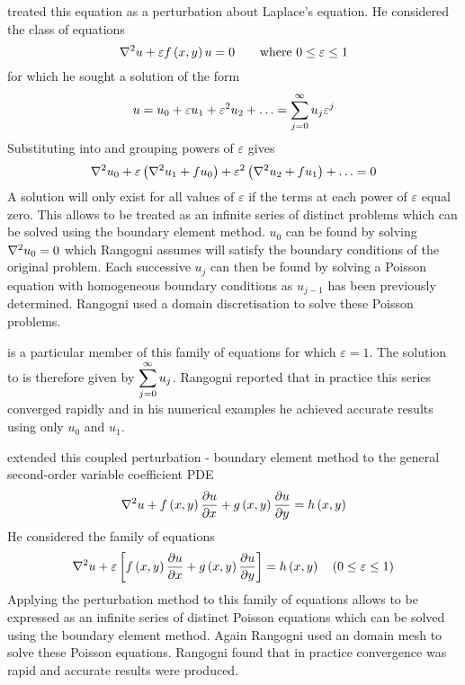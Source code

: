  treated 
this equation as a perturbation about Laplace's equation. He considered the class of equations
\begin{equation}
  \nabla^{2} {u} + \varepsilon  f\left( x,y \right)  u = 0 \qquad 
    \text{where } 0 \leq \varepsilon \leq 1
\label{eq:eqnfamily}
\end{equation}
for which he sought a solution of the form
\begin{equation}
  u = u_{0} + \varepsilon u_{1} + \varepsilon^{2} u_{2} + \ldots =
   \displaystyle\sum_{j=0}^{\infty}  u_{j} \varepsilon^{j}
\label{eq:uexpan}
\end{equation}
Substituting  into  and grouping powers
 of $\varepsilon$ gives
\begin{equation}
  \nabla^{2} {u_{0}} + \varepsilon \left( \nabla^{2} {u_{1}} + fu_{0} \right) +
  \varepsilon^{2} \left( \nabla^{2} {u_{2}} + fu_{1} \right) + \ldots = 0
\label{eq:groups}
\end{equation}
A solution will only exist for all values of $\varepsilon$ if the terms at
each power of $\varepsilon $ equal zero. This allows  to be
treated as an infinite series of distinct problems which can be solved
using the boundary element method. $u_{0}$ can be found by solving 
 $\nabla^{2} {u_{0}} = 0$ which Rangogni assumes will satisfy the boundary 
conditions of the original problem.  Each successive $u_{j}$ can then be
found by solving a Poisson equation with homogeneous boundary conditions as 
 $u_{j-1}$ has been previously determined.  Rangogni used a domain
 discretisation to solve these Poisson problems.

 is a particular member of this family of equations for
which $\varepsilon =1$.  The solution to  is therefore
given by $ \displaystyle\sum_{j=0}^{\infty}  u_{j}$. Rangogni reported that in practice
this series converged rapidly and in his numerical examples he achieved
accurate results using only $u_{0}$ and $u_{1}$.

 extended this coupled perturbation - boundary
element method to the general second-order variable coefficient PDE
\begin{equation}
  \nabla^{2} {u} +  f\left( x,y \right)   \dfrac{\partial u}{\partial x}  +  g\left( x,y \right)   \dfrac{\partial u}{\partial y}  =
   h\left( x,y \right) 
\end{equation}
He considered the family of equations
\begin{equation}
  \nabla^{2} {u} + \varepsilon \left[  f\left( x,y \right)   \dfrac{\partial u}{\partial x}  +
     g\left( x,y \right)   \dfrac{\partial u}{\partial y}  \right] =  h\left( x,y \right)  
    \quad (0 \leq \varepsilon \leq 1)
\label{eq:family2}
\end{equation}
Applying the perturbation method to this family of equations allows
 to be expressed as an infinite series of distinct Poisson
equations which can be solved using the boundary element method. Again
Rangogni used an domain mesh to solve these Poisson equations.  Rangogni
found that in practice convergence was rapid and accurate results were
produced.

